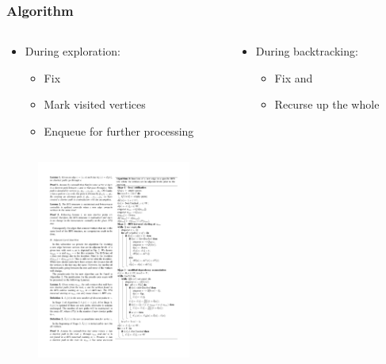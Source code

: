 \begin{frame}
  \frametitle{Algorithm}
  \begin{columns}[onlytextwidth]

    \begin{column}{0.5\textwidth}
      \begin{itemize}
        \item During exploration:
          \begin{itemize}
            \item Fix \paths
            \item Mark visited vertices
            \item Enqueue for further processing
          \end{itemize}
      \end{itemize}
    \end{column}
    \begin{column}{0.5\textwidth}
      \begin{itemize}
        \item During backtracking:%
          \begin{itemize}
            \item Fix \dep and \betw
            \item Recurse up the whole \spdag
          \end{itemize}
      \end{itemize}
    \end{column}
  \end{columns}
      \begin{figure}[t]
        \centering
        \includegraphics[width=0.45\textwidth, height=0.6\textheight, keepaspectratio, valign=t]{imgs/green-algo1}

\end{figure}
\end{frame}
